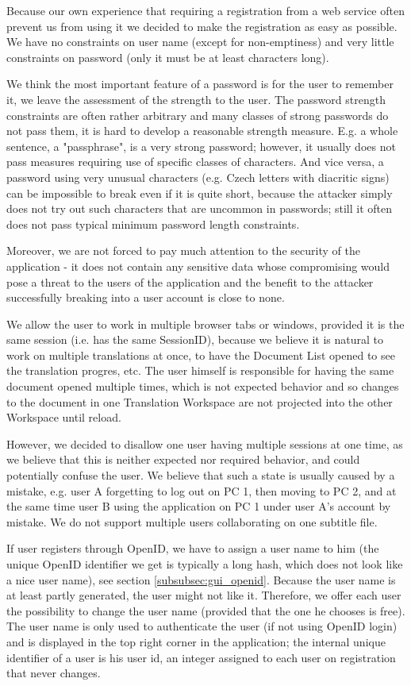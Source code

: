 Because our own experience that requiring a registration from a web service often prevent us from using it we decided to make the registration as easy as possible. We have no constraints on user name (except for non-emptiness) and very little constraints on password (only it must be at least characters long).

We think the most important feature of a password is for the user to remember it, we leave the assessment of the strength to the user. The password strength constraints are often rather arbitrary and many classes of strong passwords do not pass them, it is hard to develop a reasonable strength measure. E.g. a whole sentence, a "passphrase", is a very strong password; however, it usually does not pass measures requiring use of specific classes of characters. And vice versa, a password using very unusual characters (e.g. Czech letters with diacritic signs) can be impossible to break even if it is quite short, because the attacker simply does not try out such characters that are uncommon in passwords; still it often does not pass typical minimum password length constraints.

Moreover, we are not forced to pay much attention to the security of the application - it does not contain any sensitive data whose compromising would pose a threat to the users of the application and the benefit to the attacker successfully breaking into a user account is close to none.

We allow the user to work in multiple browser tabs or windows, provided it is the same session (i.e. has the same SessionID), because we believe it is natural to work on multiple translations at once, to have the Document List opened to see the translation progres, etc. The user himself is responsible for having the same document opened multiple times, which is not expected behavior and so changes to the document in one Translation Workspace are not projected into the other Workspace until reload.

However, we decided to disallow one user having multiple sessions at one time, as we believe that this is neither expected nor required behavior, and could potentially confuse the user. We believe that such a state is usually caused by a mistake, e.g. user A forgetting to log out on PC 1, then moving to PC 2, and at the same time user B using the application on PC 1 under user A's account by mistake.
We do not support multiple users collaborating on one subtitle file.

If user registers through OpenID, we have to assign a user name to him (the unique OpenID identifier we get is typically a long hash, which does not look like a nice user name), see section \ref{subsubsec:gui_openid}. Because the user name is at least partly generated, the user might not like it. Therefore, we offer each user the possibility to change the user name (provided that the one he chooses is free). The user name is only used to authenticate the user (if not using OpenID login) and is displayed in the top right corner in the application; the internal unique identifier of a user is his user id, an integer assigned to each user on registration that never changes.

